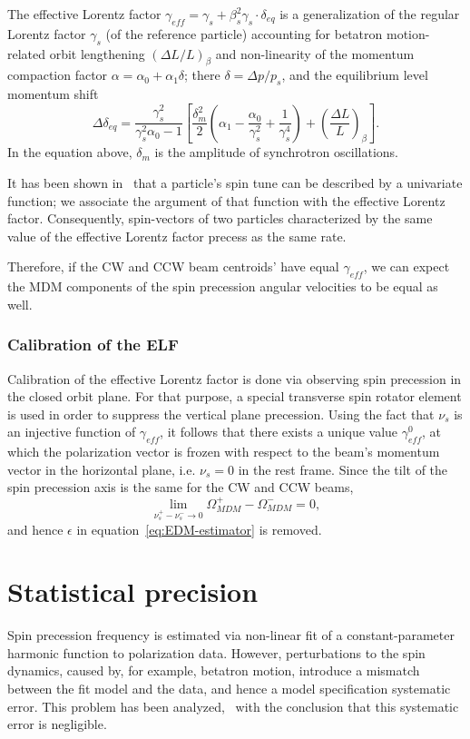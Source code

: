 \documentclass[a4paper]{jpconf}
\newcommand{\W}{\Omega}
\newcommand{\geff}{\gamma_{eff}}
\begin{document}
The effective Lorentz factor $\geff = \gamma_s + \beta_s^2\gamma_s\cdot\delta_{eq}$ is a generalization of the regular Lorentz factor $\gamma_s$ (of the reference particle) accounting for betatron motion-related orbit lengthening $(\Delta L/L)_\beta$ and non-linearity of the momentum compaction factor $\alpha = \alpha_0 + \alpha_1\delta$; there $\delta=\Delta p/p_s$, and the equilibrium level momentum shift~\cite{Senichev:FDM, Senichev:IPAC13}
\begin{equation*}\label{eq:equ-delta-shift}
	\Delta\delta_{eq} = \frac{\gamma_s^2}{\gamma_s^2\alpha_0-1}\left[\frac{\delta_m^2}{2}\left(\alpha_1 - \frac{\alpha_0}{\gamma_s^2}+ \frac{1}{\gamma_s^4}\right) + \left(\frac{\Delta L}{L}\right)_\beta\right].
\end{equation*}
In the equation above, $\delta_m$ is the amplitude of synchrotron oscillations.

It has been shown in~\cite[p.~56]{Aksentev:Thesis} that a particle's spin tune can be described by a univariate function; we associate the argument of that function with the effective Lorentz factor. Consequently, spin-vectors of two particles characterized by the same value of the effective Lorentz factor precess as the same rate.

Therefore, if the CW and CCW beam centroids' have equal $\geff$, we can expect the MDM components of the spin precession angular velocities to be equal as well.

\subsubsection{Calibration of the ELF}
Calibration of the effective Lorentz factor is done via observing spin precession in the closed orbit plane. For that purpose, a special transverse spin rotator element is used in order to suppress the vertical plane precession.  Using the fact that $\nu_s$ is an injective function of $\geff$, it follows that there exists a unique value $\geff^0$, at which the polarization vector is frozen with respect to the beam's momentum vector in the horizontal plane, i.e. $\nu_s=0$ in the rest frame. Since the tilt of the spin precession axis is the same for the CW and CCW beams,  
\[
\lim_{\nu_s^+ - \nu_s^- \to 0} \W_{MDM}^+ - \W_{MDM}^- = 0,
\]
and hence $\epsilon$ in equation~\eqref{eq:EDM-estimator} is removed.

\section{Statistical precision}
Spin precession frequency is estimated via non-linear fit of a constant-parameter harmonic function to polarization data. However, perturbations to the spin dynamics, caused by, for example, betatron motion, introduce a mismatch between the fit model and the data, and hence a model specification systematic error. This problem has been analyzed,~\cite{Aksentev:IPAC19:SMP} with the conclusion that this systematic error is negligible.
\end{document}
